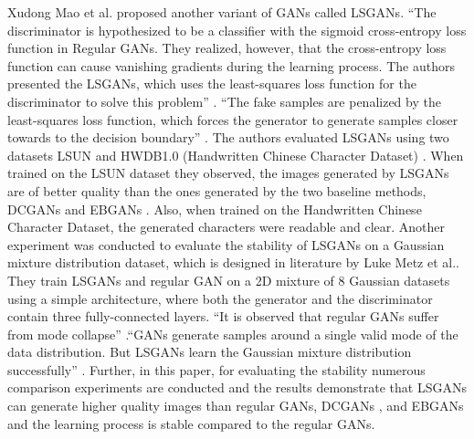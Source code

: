 Xudong Mao et al.\cite{mao2017squares} proposed another variant of \acp{GAN} called \acp{LSGAN}. ``The discriminator is hypothesized to be a classifier with the sigmoid cross-entropy loss function in Regular \acp{GAN}. They realized, however, that the cross-entropy loss function can cause vanishing gradients during the learning process. The authors presented the \acp{LSGAN}, which uses the least-squares loss function for the discriminator to solve this problem'' \cite{mao2017squares}. ``The fake samples are penalized by the least-squares loss function, which forces the generator to generate samples closer towards to the decision boundary'' \cite{mao2017squares}. The authors evaluated \acp{LSGAN} using two datasets LSUN \cite{yu2016lsun} and HWDB1.0 (Handwritten Chinese Character Dataset) \cite{6065551}. When trained on the LSUN dataset \cite{yu2016lsun} they observed, the images generated by \acp{LSGAN} are of better quality than the ones generated by the two baseline methods, \acp{DCGAN} \cite{radford2016unsupervised} and EBGANs \cite{zhao2017energybased}. Also, when trained on the Handwritten Chinese Character Dataset, the generated characters were readable and clear. Another experiment was conducted to evaluate the stability of \acp{LSGAN} on a Gaussian mixture distribution dataset, which is designed in literature by Luke Metz et al.\cite{metz2017unrolled}. They train \acp{LSGAN} and regular \ac{GAN} on a 2D mixture of 8 Gaussian datasets using a simple architecture, where both the generator and the discriminator contain three fully-connected layers. ``It is observed that regular \acp{GAN} suffer from mode collapse'' \cite{mao2017squares}.``\acp{GAN} generate samples around a single valid mode of the data distribution. But \acp{LSGAN} learn the Gaussian mixture distribution successfully'' \cite{mao2017squares}. Further, in this paper, for evaluating the stability numerous comparison experiments are conducted and the results demonstrate that \acp{LSGAN} can generate higher quality images than regular \acp{GAN}, \acp{DCGAN} \cite{radford2016unsupervised}, and \acp{EBGAN} \cite{zhao2017energybased} and the learning process is stable compared to the regular \acp{GAN}.



